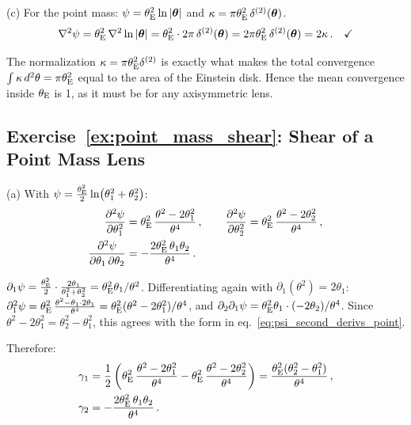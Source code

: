 (c) For the point mass: $\psi = \theta_{\mathrm{E}}^2\ln|\boldsymbol{\theta}|$
and $\kappa = \pi\theta_{\mathrm{E}}^2\,\delta^{(2)}(\boldsymbol{\theta})$.
\begin{equation*}
    \nabla^2\psi = \theta_{\mathrm{E}}^2\,\nabla^2\ln|\boldsymbol{\theta}|
    = \theta_{\mathrm{E}}^2 \cdot 2\pi\,\delta^{(2)}(\boldsymbol{\theta})
    = 2\pi\theta_{\mathrm{E}}^2\,\delta^{(2)}(\boldsymbol{\theta})
    = 2\kappa \,. \quad \checkmark
\end{equation*}
\begin{annotation}
The normalization $\kappa = \pi\theta_{\mathrm{E}}^2\delta^{(2)}$ is exactly what makes
the total convergence $\int\kappa\,d^2\theta = \pi\theta_{\mathrm{E}}^2$ equal to the
area of the Einstein disk. Hence the mean convergence inside
$\theta_{\mathrm{E}}$ is 1, as it must be for any axisymmetric lens.
\end{annotation}

\subsection*{Exercise~\ref{ex:point_mass_shear}: Shear of a Point Mass Lens}

(a) With $\psi = \frac{\theta_{\mathrm{E}}^2}{2}\ln(\theta_1^2 + \theta_2^2)$:
\begin{align*}
    \frac{\partial^2\psi}{\partial\theta_1^2}
    &= \theta_{\mathrm{E}}^2\,\frac{\theta^2 - 2\theta_1^2}{\theta^4} \,, \qquad
    \frac{\partial^2\psi}{\partial\theta_2^2}
    = \theta_{\mathrm{E}}^2\,\frac{\theta^2 - 2\theta_2^2}{\theta^4} \,, \\
    \frac{\partial^2\psi}{\partial\theta_1\,\partial\theta_2}
    &= -\frac{2\theta_{\mathrm{E}}^2\,\theta_1\theta_2}{\theta^4} \,.
\end{align*}
\begin{derivation}
$\partial_1\psi = \frac{\theta_{\mathrm{E}}^2}{2}\cdot\frac{2\theta_1}{\theta_1^2 + \theta_2^2}
= \theta_{\mathrm{E}}^2\theta_1/\theta^2$. Differentiating again with
$\partial_1(\theta^2) = 2\theta_1$:
$\partial_1^2\psi = \theta_{\mathrm{E}}^2\,\frac{\theta^2 - \theta_1\cdot2\theta_1}{\theta^4}
= \theta_{\mathrm{E}}^2(\theta^2 - 2\theta_1^2)/\theta^4$, and
$\partial_2\partial_1\psi = \theta_{\mathrm{E}}^2\theta_1\cdot(-2\theta_2)/\theta^4$.
Since $\theta^2 - 2\theta_1^2 = \theta_2^2 - \theta_1^2$, this agrees with the
form in eq.~\eqref{eq:psi_second_derivs_point}.
\end{derivation}
Therefore:
\begin{align*}
    \gamma_1 &= \frac{1}{2}\left(
    \theta_{\mathrm{E}}^2\,\frac{\theta^2 - 2\theta_1^2}{\theta^4}
    - \theta_{\mathrm{E}}^2\,\frac{\theta^2 - 2\theta_2^2}{\theta^4}\right)
    = \frac{\theta_{\mathrm{E}}^2(\theta_2^2 - \theta_1^2)}{\theta^4} \,, \\
    \gamma_2 &= -\frac{2\theta_{\mathrm{E}}^2\,\theta_1\theta_2}{\theta^4} \,.
\end{align*}


